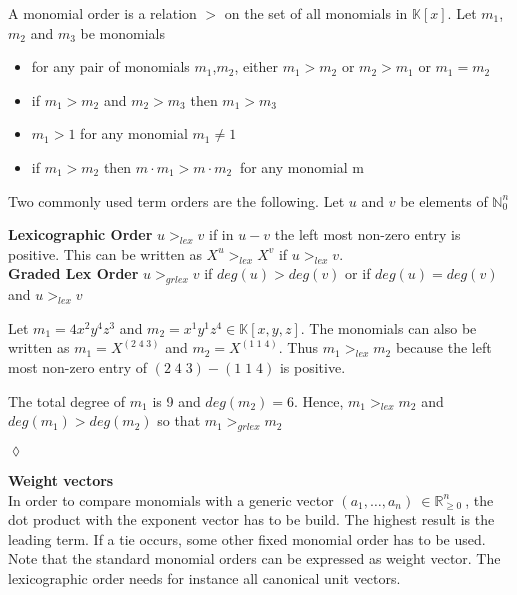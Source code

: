 \begin{env_definition} 
\cite{saleemi}
A monomial order is a relation $>$ on the set of all monomials in $\mathbb{K}\left[x\right]$.
Let $m_{1}$, $m_{2}$ and $m_{3}$ be monomials
\begin{center}

\begin{itemize}

\item
for any pair of monomials $m_{1}$,$m_{2}$, either $m_{1} > m_{2}$ or $m_{2} > m_{1}$ or $m_{1} = m_{2}$ 
\item
if $m_{1} > m_{2} $ and $m_{2} > m_{3}$ then $m_{1} > m_{3}$
\item
$m_{1} > 1$ for any monomial $m_{1} \neq 1$
\item
if $m_{1} > m_{2}$ then $m \cdot m_{1} > m \cdot m_{2}~$ for any monomial m

\end{itemize}
 
\end{center}

\end{env_definition}


Two commonly used term orders are the following.
Let $u$ and $v$ be elements of $\mathbb{N}^{n}_{0}$ 

\textbf{Lexicographic Order}\cite{saleemi}
$u >_{lex} v $ if in $u-v$ the left most non-zero entry is positive.
This can be written as $X^{u} >_{lex} X^{v}$ if $u >_{lex} v $.\\


\textbf{Graded Lex Order}\cite{saleemi}
$u >_{grlex} v $ if $ deg(u)>deg(v)$ or if $ deg(u)=deg(v)$ and $u >_{lex} v$

\begin{env_example} \normalfont
Let $m_{1} = 4x^{2}y^{4}z^{3}$ and $m_{2}= x^{1}y^{1}z^{4} \in \mathbb{K}\left[ x,y,z\right]  $.
The monomials can also be written as $m_{1} = X^{(2 \; 4 \; 3)}$ and $m_{2} = X^{(1 \; 1 \; 4)}$.
Thus $m_{1}>_{lex} m_{2}$ because the left most non-zero entry of $ (2 \; 4 \; 3) - (1 \; 1 \; 4)$ is positive.

The total degree of $m_{1}$ is 9 and $deg(m_{2})=6$. Hence, $m_{1}>_{lex} m_{2}$ and
$deg(m_{1})>deg(m_{2})$ so that $m_{1}>_{grlex} m_{2}$ 
\begin{flushright}
$\lozenge$
\end{flushright}
\end{env_example}
  

\textbf{Weight vectors} \\
In order to compare monomials with a generic vector $\left({a}_{1},\dots ,{a}_{n}\right)~\in \mathbb{R}^{n}_{\geq 0}~$, the dot product with the exponent vector has to be build. The highest result is the leading term. If a tie occurs, some other fixed monomial order has to be used. Note that the standard monomial orders can be expressed as weight vector. The lexicographic order needs for instance all canonical unit vectors.

